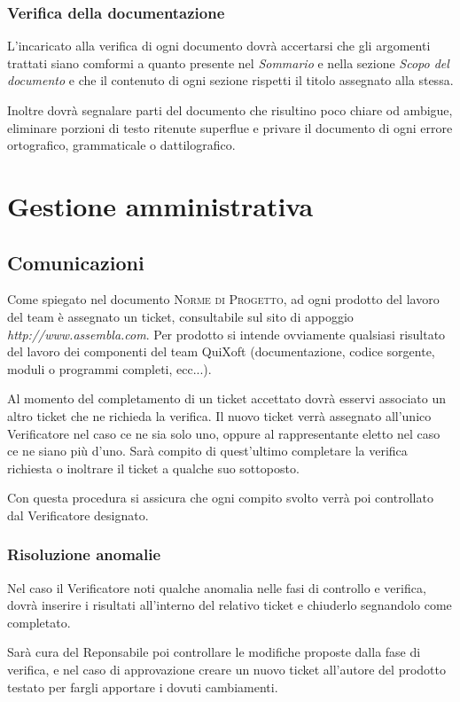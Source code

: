 \documentclass[11pt,a4paper]{article}
\begin{document}
\subsubsection{Verifica della documentazione}
L'incaricato alla verifica di ogni documento dovrà accertarsi che gli argomenti trattati siano comformi a quanto presente nel \textit{Sommario} e nella sezione \textit{Scopo del documento} e che il contenuto di ogni sezione rispetti il titolo assegnato alla stessa.

Inoltre dovrà segnalare parti del documento che risultino poco chiare od ambigue, eliminare porzioni di testo ritenute superflue e privare il documento di ogni errore ortografico, grammaticale o dattilografico. 

\section{Gestione amministrativa}
\subsection{Comunicazioni}
Come spiegato nel documento \textsc{Norme di Progetto}, ad ogni prodotto del lavoro del team è assegnato un ticket, consultabile sul sito di appoggio \textit{http://www.assembla.com}. Per prodotto si intende ovviamente qualsiasi risultato del lavoro dei componenti del team QuiXoft (documentazione, codice sorgente, moduli o programmi completi, ecc...).

Al momento del completamento di un ticket accettato dovrà esservi associato un altro ticket che ne richieda la verifica. Il nuovo ticket verrà assegnato all'unico Verificatore nel caso ce ne sia solo uno, oppure al rappresentante eletto nel caso ce ne siano più d'uno. Sarà compito di quest'ultimo completare la verifica richiesta o inoltrare il ticket a qualche suo sottoposto.

Con questa procedura si assicura che ogni compito svolto verrà poi controllato dal Verificatore designato.
\subsubsection{Risoluzione anomalie}
Nel caso il Verificatore noti qualche anomalia nelle fasi di controllo e verifica, dovrà inserire i risultati all'interno del relativo ticket e chiuderlo segnandolo come completato.

Sarà cura del Reponsabile poi controllare le modifiche proposte dalla fase di verifica, e nel caso di approvazione creare un nuovo ticket all'autore del prodotto testato per fargli apportare i dovuti cambiamenti.
\end{document}
